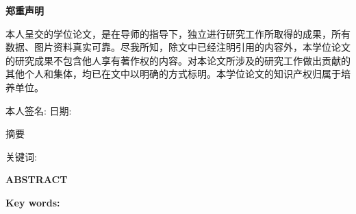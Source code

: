 \newpage
\thispagestyle{empty}
\renewcommand{\baselinestretch}{1.5}  %

\vspace*{28mm}
\begin{center}{\songti {} \textbf{郑重声明}}\end{center}
\par\vspace*{20pt}
\renewcommand{\baselinestretch}{2}
{%

本人呈交的学位论文，是在导师的指导下，独立进行研究工作所取得的成果，所有数据、图片资料真实可靠。尽我所知，除文中已经注明引用的内容外，本学位论文的研究成果不包含他人享有著作权的内容。对本论文所涉及的研究工作做出贡献的其他个人和集体，均已在文中以明确的方式标明。本学位论文的知识产权归属于培养单位。
\par
\vspace{3.5cm}
\hspace*{0.5cm}本人签名: \underline{\hspace{3.5cm}}
\hspace{2cm}日期: \underline{\hspace{3.5cm}}\hfill\par}
\baselineskip=23pt


\newcommand\cnkeywords[1]{ {\noindent\heiti\zihao{-4} 关键词: }\zihao{-4}#1}
\newcommand\enkeywords[1]{ {\noindent\bfseries\zihao{-4} Key words: }\zihao{-4}#1}

\newpage
\thispagestyle{empty}
\vspace{10pt}
\begin{center}{\heiti {} 摘要}\end{center}
\renewcommand{\baselinestretch}{1.5}
\baselineskip=23pt%

{\songti {}%

\the\CNabstract
}
\par
\vspace*{2em}
\cnkeywords{\the\CNkeywords}


\newpage
\thispagestyle{empty}
\vspace{10pt}
\begin{center}{ \textbf{ABSTRACT}}\end{center}
\renewcommand{\baselinestretch}{1.5}
\baselineskip=23pt%
{%

\the\ENabstract
}
\par
\vspace*{2em}
\enkeywords{\the\ENkeywords}

\renewcommand{\baselinestretch}{1}\normalsize
\baselineskip=23pt%

\cleardoublepage
{}  %
\tableofcontents   %
\cleardoublepage
{}%
\setcounter{page}{1}
